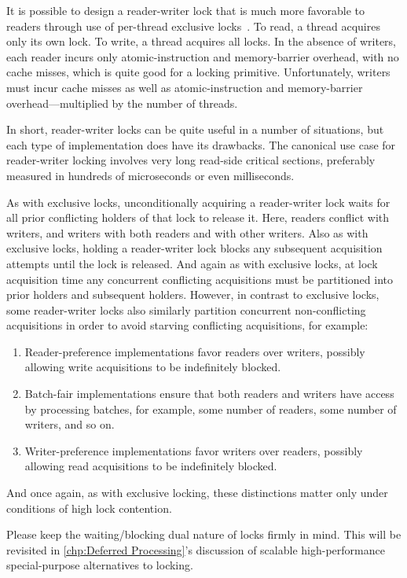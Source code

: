 It is possible to design a reader-writer lock that is much more
favorable to readers through use of per-thread exclusive
locks~\cite{WilsonCHsieh92a}.
To read, a thread acquires only its own lock.
To write, a thread acquires all locks.
In the absence of writers, each reader incurs only atomic-instruction
and memory-barrier overhead, with no cache misses, which is quite
good for a locking primitive.
Unfortunately, writers must incur cache misses as well as atomic-instruction
and memory-barrier overhead---multiplied by the number of threads.

In short, reader-writer locks can be quite useful in a number of
situations, but each type of implementation does have its drawbacks.
The canonical use case for reader-writer locking involves very long
read-side critical sections, preferably measured in hundreds of microseconds
or even milliseconds.

As with exclusive locks, unconditionally acquiring a reader-writer lock
waits for all prior conflicting holders of that lock to release it.
Here, readers conflict with writers, and writers with both readers and
with other writers.
Also as with exclusive locks, holding a reader-writer lock blocks any
subsequent acquisition attempts until the lock is released.
And again as with exclusive locks, at lock acquisition time any concurrent
conflicting acquisitions must be partitioned into prior holders and
subsequent holders.
However, in contrast to exclusive locks, some reader-writer locks also
similarly partition concurrent non-conflicting acquisitions in order to
avoid starving conflicting acquisitions, for example:

\begin{enumerate}
\item	Reader-preference implementations favor readers over writers,
	possibly allowing write acquisitions to be indefinitely blocked.
\item	Batch-fair implementations ensure that both readers and writers
	have access by processing batches, for example, some number of
	readers, some number of writers, and so on.
\item	Writer-preference implementations favor writers over readers,
	possibly allowing read acquisitions to be indefinitely blocked.
\end{enumerate}

And once again, as with exclusive locking, these distinctions matter
only under conditions of high lock contention.

Please keep the waiting/blocking dual nature of locks firmly in mind.
This will be revisited in \cref{chp:Deferred Processing}'s discussion
of scalable high-performance special-purpose alternatives to locking.

